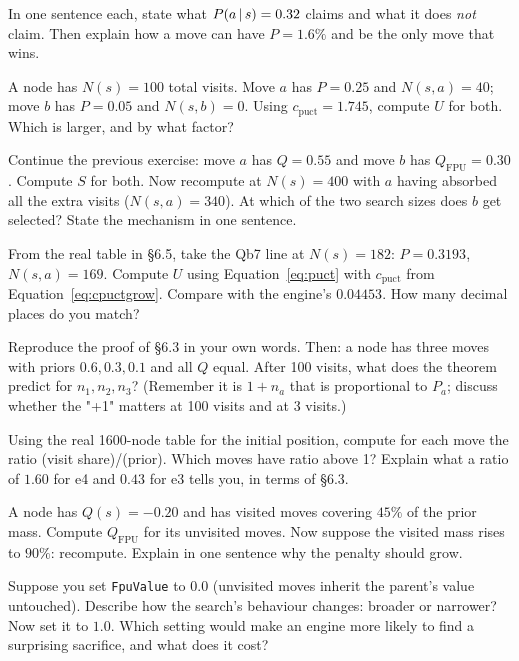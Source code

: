 \begin{exercises}

 In one sentence each, state what $P(a\,|\, s) = 0.32$
claims and what it does \emph{not} claim. Then explain how a move can have $P = 1.6\%$ and be
the only move that wins.

 A node has $N(s) = 100$ total visits. Move $a$ has
$P = 0.25$ and $N(s,a) = 40$; move $b$ has $P = 0.05$ and $N(s,b) = 0$. Using
$c_{\text{puct}} = 1.745$, compute $U$ for both. Which is larger, and by what factor?

 Continue the previous exercise: move $a$ has
$Q = 0.55$ and move $b$ has $Q_{\text{FPU}} = 0.30$. Compute $S$ for both. Now recompute at
$N(s) = 400$ with $a$ having absorbed all the extra visits ($N(s,a) = 340$). At which of the
two search sizes does $b$ get selected? State the mechanism in one sentence.

 From the real table in §6.5, take the Qb7 line at
$N(s)=182$: $P = 0.3193$, $N(s,a) = 169$. Compute $U$ using Equation~\eqref{eq:puct} with
$c_{\text{puct}}$ from Equation~\eqref{eq:cpuctgrow}. Compare with the engine's $0.04453$.
How many decimal places do you match?

 Reproduce the proof of §6.3 in your own
words. Then: a node has three moves with priors $0.6, 0.3, 0.1$ and all $Q$ equal. After 100
visits, what does the theorem predict for $n_1, n_2, n_3$? (Remember it is $1+n_a$ that is
proportional to $P_a$; discuss whether the "+1" matters at 100 visits and at 3 visits.)

 Using the real 1600-node table for the initial position,
compute for each move the ratio (visit share)/(prior). Which moves have ratio above 1?
Explain what a ratio of $1.60$ for e4 and $0.43$ for e3 tells you, in terms of §6.3.

 A node has $Q(s) = -0.20$ and has visited moves covering $45\%$
of the prior mass. Compute $Q_{\text{FPU}}$ for its unvisited moves. Now suppose the visited
mass rises to $90\%$: recompute. Explain in one sentence why the penalty should grow.

 Suppose you set \texttt{FpuValue} to $0.0$
(unvisited moves inherit the parent's value untouched). Describe how the search's behaviour
changes: broader or narrower? Now set it to $1.0$. Which setting would make an engine more
likely to find a surprising sacrifice, and what does it cost?


\end{exercises}
